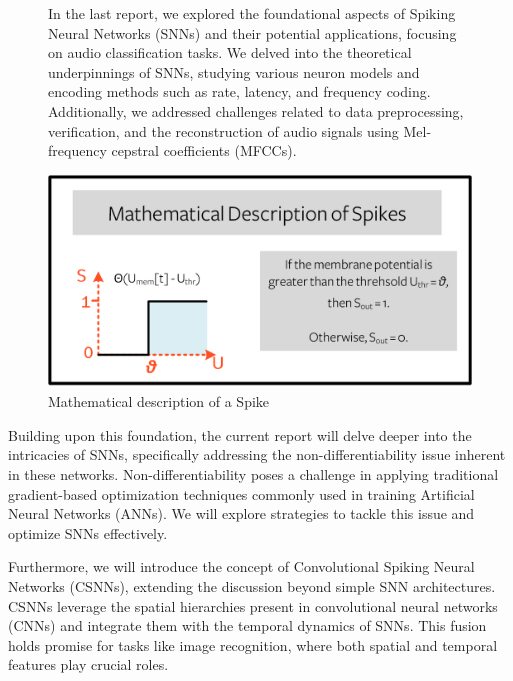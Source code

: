 \documentclass[11pt]{article}
\begin{document}
\begin{figure}[ht]
  \begin{minipage}[b]{0.45\textwidth}
    In the last report, we explored the foundational aspects of Spiking Neural Networks (SNNs) and their potential applications, focusing on audio classification tasks. We delved into the theoretical underpinnings of SNNs, studying various neuron models and encoding methods such as rate, latency, and frequency coding. Additionally, we addressed challenges related to data preprocessing, verification, and the reconstruction of audio signals using Mel-frequency cepstral coefficients (MFCCs).
  \end{minipage}
  \hfill
  \begin{minipage}[b]{0.5\textwidth}
    \centering
    \includegraphics[width=\textwidth]{./image/spike_description.png}
    \caption{Mathematical description of a Spike\cite{eshraghian2021training}}
    \label{fig:spike_description}
  \end{minipage}
\end{figure}

Building upon this foundation, the current report will delve deeper into the intricacies of SNNs, specifically addressing the non-differentiability issue inherent in these networks. Non-differentiability poses a challenge in applying traditional gradient-based optimization techniques commonly used in training Artificial Neural Networks (ANNs). We will explore strategies to tackle this issue and optimize SNNs effectively.

Furthermore, we will introduce the concept of Convolutional Spiking Neural Networks (CSNNs), extending the discussion beyond simple SNN architectures. CSNNs leverage the spatial hierarchies present in convolutional neural networks (CNNs) and integrate them with the temporal dynamics of SNNs. This fusion holds promise for tasks like image recognition, where both spatial and temporal features play crucial roles.
\end{document}
